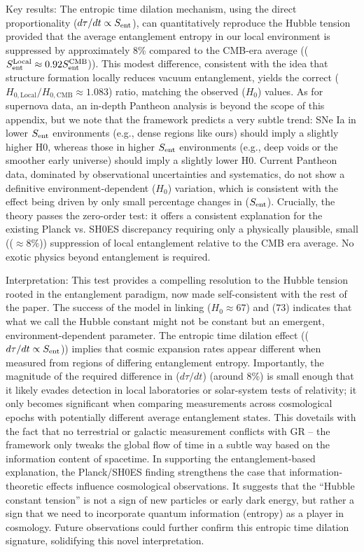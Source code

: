 \documentclass[11pt]{article}
\begin{document}
Key results: The entropic time dilation mechanism, using the direct proportionality ($d\tau/dt \propto S_{\rm ent}$), can quantitatively reproduce the Hubble tension provided that the average entanglement entropy in our local environment is suppressed by approximately 8\% compared to the CMB-era average (($S_{\rm ent}^{\rm Local} \approx 0.92 S_{\rm ent}^{\rm CMB}$)). This modest difference, consistent with the idea that structure formation locally reduces vacuum entanglement, yields the correct ($H_{0, \text{Local}} / H_{0, \text{CMB}} \approx 1.083$) ratio, matching the observed ($H_0$) values. As for supernova data, an in-depth Pantheon analysis is beyond the scope of this appendix, but we note that the framework predicts a very subtle trend: SNe Ia in lower $S_{\rm ent}$ environments (e.g., dense regions like ours) should imply a slightly higher H0, whereas those in higher $S_{\rm ent}$ environments (e.g., deep voids or the smoother early universe) should imply a slightly lower H0. Current Pantheon data, dominated by observational uncertainties and systematics, do not show a definitive environment-dependent ($H_0$) variation, which is consistent with the effect being driven by only small percentage changes in ($S_{\rm ent}$). Crucially, the theory passes the zero-order test: it offers a consistent explanation for the existing Planck vs. SH0ES discrepancy requiring only a physically plausible, small (($\approx 8\%$)) suppression of local entanglement relative to the CMB era average. No exotic physics beyond entanglement is required.

Interpretation: This test provides a compelling resolution to the Hubble tension rooted in the entanglement paradigm, now made self-consistent with the rest of the paper. The success of the model in linking ($H_0 \approx 67$) and ($73$) indicates that what we call the Hubble constant might not be constant but an emergent, environment-dependent parameter. The entropic time dilation effect (($d\tau/dt \propto S_{\rm ent}$)) implies that cosmic expansion rates appear different when measured from regions of differing entanglement entropy. Importantly, the magnitude of the required difference in ($d\tau/dt$) (around 8\%) is small enough that it likely evades detection in local laboratories or solar-system tests of relativity; it only becomes significant when comparing measurements across cosmological epochs with potentially different average entanglement states. This dovetails with the fact that no terrestrial or galactic measurement conflicts with GR – the framework only tweaks the global flow of time in a subtle way based on the information content of spacetime. In supporting the entanglement-based explanation, the Planck/SH0ES finding strengthens the case that information-theoretic effects influence cosmological observations. It suggests that the “Hubble constant tension” is not a sign of new particles or early dark energy, but rather a sign that we need to incorporate quantum information (entropy) as a player in cosmology. Future observations could further confirm this entropic time dilation signature, solidifying this novel interpretation.
\end{document}

